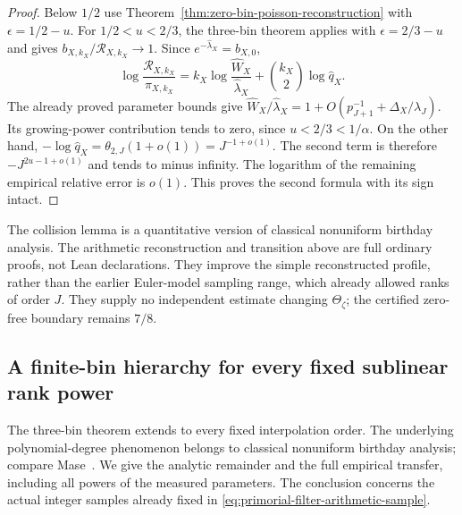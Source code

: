 \documentclass[11pt]{article}
\theoremstyle{definition}
\begin{document}
\begin{proof}
Below $1/2$ use
Theorem~\ref{thm:zero-bin-poisson-reconstruction} with
$\epsilon=1/2-u$.
For $1/2<u<2/3$, the three-bin theorem applies with
$\epsilon=2/3-u$ and gives $b_{X,k_X}/\mathcal R_{X,k_X}\to1$.
Since $e^{-\widehat\lambda_X}=b_{X,0}$,
\[
 \log\frac{\mathcal R_{X,k_X}}{\pi_{X,k_X}}
   =k_X\log\frac{\widehat W_X}{\widehat\lambda_X}
       +{k_X\choose2}\log\widehat q_X .
\]
The already proved parameter bounds give
$\widehat W_X/\widehat\lambda_X
 =1+O(p_{J+1}^{-1}+\Delta_X/\lambda_J)$.
Its growing-power contribution tends to zero, since
$u<2/3<1/\alpha$.
On the other hand,
$-\log\widehat q_X=\theta_{2,J}(1+o(1))=J^{-1+o(1)}$.
The second term is therefore $-J^{2u-1+o(1)}$ and tends
to minus infinity.
The logarithm of the remaining empirical relative error is $o(1)$.
This proves the second formula with its sign intact.
\end{proof}

The collision lemma is a quantitative version of classical
nonuniform birthday analysis.  The arithmetic reconstruction and
transition above are full ordinary proofs, not Lean declarations.
They improve the simple reconstructed profile, rather than the
earlier Euler-model sampling range, which already allowed ranks
of order $J$.  They supply no independent estimate changing
$\Theta_\zeta$; the certified zero-free boundary remains $7/8$.

\subsection{A finite-bin hierarchy for every fixed sublinear rank power}
\label{sec:finite-bin-hierarchy}

The three-bin theorem extends to every fixed interpolation order.
The underlying polynomial-degree phenomenon belongs to classical
nonuniform birthday analysis; compare
Mase~\cite[Proposition~5.2]{MaseCollision}.
We give the analytic remainder and the full empirical transfer,
including all powers of the measured parameters.
The conclusion concerns the actual integer samples already fixed
in \eqref{eq:primorial-filter-arithmetic-sample}.
\end{document}
